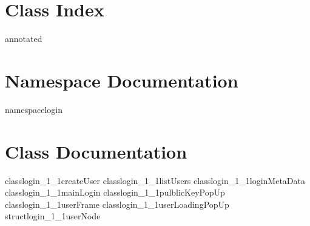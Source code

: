 

	\chapter{Class Index}
		{annotated}
	\chapter{Namespace Documentation}
		{namespacelogin}
		
	\chapter{Class Documentation}
	
		{classlogin_1_1createUser}
		{classlogin_1_1listUsers}
		{classlogin_1_1loginMetaData}
		{classlogin_1_1mainLogin}
		{classlogin_1_1pulblicKeyPopUp}
		{classlogin_1_1userFrame}
		{classlogin_1_1userLoadingPopUp}
		{structlogin_1_1userNode}